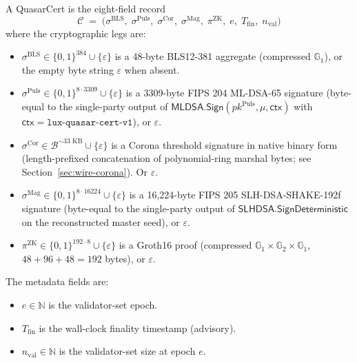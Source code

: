 \begin{definition}
\label{def:cert}
A QuasarCert is the eight-field record
\[
\mathcal{C} \;=\; \bigl(\sigma^{\mathrm{BLS}},\;
\sigma^{\mathrm{Puls}},\;
\sigma^{\mathrm{Cor}},\;
\sigma^{\mathrm{Mag}},\;
\pi^{\mathrm{ZK}},\;
e,\;
T_{\mathrm{fin}},\;
n_{\mathrm{val}}\bigr)
\]
where the cryptographic legs are:
\begin{itemize}[leftmargin=2em,nosep]
\item $\sigma^{\mathrm{BLS}} \in \{0,1\}^{384} \cup \{\varepsilon\}$ is
      a 48-byte BLS12-381 aggregate (compressed $\mathbb{G}_1$), or
      the empty byte string $\varepsilon$ when absent.
\item $\sigma^{\mathrm{Puls}} \in \{0,1\}^{8 \cdot 3309}
      \cup \{\varepsilon\}$ is a 3309-byte FIPS 204 ML-DSA-65 signature
      (byte-equal to the single-party output of
      $\mathsf{MLDSA.Sign}(\mathit{pk}^{\mathrm{Puls}}, \mu,
      \mathsf{ctx})$ with $\mathsf{ctx} = \texttt{lux-quasar-cert-v1}$), or $\varepsilon$.
\item $\sigma^{\mathrm{Cor}} \in \mathcal{B}^{\sim 33\text{ KB}} \cup
      \{\varepsilon\}$ is a Corona threshold signature in native binary
      form (length-prefixed concatenation of polynomial-ring marshal
      bytes; see Section~\ref{sec:wire-corona}). Or $\varepsilon$.
\item $\sigma^{\mathrm{Mag}} \in \{0,1\}^{8 \cdot 16224} \cup
      \{\varepsilon\}$ is a 16{,}224-byte FIPS 205 SLH-DSA-SHAKE-192f
      signature (byte-equal to the single-party output of
      $\mathsf{SLHDSA.SignDeterministic}$ on the reconstructed master
      seed), or $\varepsilon$.
\item $\pi^{\mathrm{ZK}} \in \{0,1\}^{192 \cdot 8} \cup \{\varepsilon\}$
      is a Groth16 proof (compressed $\mathbb{G}_1 \times \mathbb{G}_2
      \times \mathbb{G}_1$, $48 + 96 + 48 = 192$ bytes), or
      $\varepsilon$.
\end{itemize}
The metadata fields are:
\begin{itemize}[leftmargin=2em,nosep]
\item $e \in \mathbb{N}$ is the validator-set epoch.
\item $T_{\mathrm{fin}}$ is the wall-clock finality timestamp (advisory).
\item $n_{\mathrm{val}} \in \mathbb{N}$ is the validator-set size at
      epoch $e$.
\end{itemize}
\end{definition}


